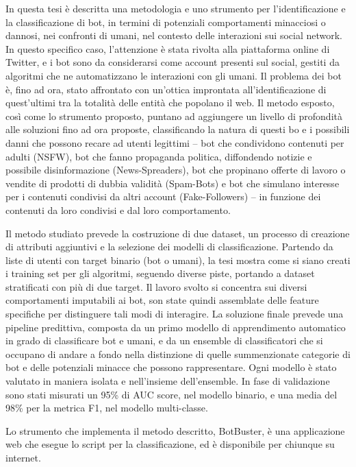 
In questa tesi è descritta una metodologia e uno strumento per l'identificazione e la classificazione di bot, in termini di potenziali comportamenti minacciosi o dannosi, nei confronti di umani, nel contesto delle interazioni sui social network.
In questo specifico caso, l'attenzione è stata rivolta alla piattaforma online di Twitter, e i bot sono da considerarsi come account presenti sul social, gestiti da algoritmi che ne automatizzano le interazioni con gli umani.
Il problema dei bot è, fino ad ora, stato affrontato con un'ottica improntata all'identificazione di quest'ultimi tra la totalità delle entità che popolano il web.
Il metodo esposto, così come lo strumento proposto, puntano ad aggiungere un livello di profondità alle soluzioni fino ad ora proposte, classificando la natura di questi bo e i possibili danni che possono recare ad utenti legittimi -- bot che condividono contenuti per adulti (NSFW), bot che fanno propaganda politica, diffondendo notizie e possibile disinformazione (News-Spreaders), bot che propinano offerte di lavoro o vendite di prodotti di dubbia validità (Spam-Bots) e bot che simulano interesse per i contenuti condivisi da altri account (Fake-Followers) -- in funzione dei contenuti da loro condivisi e dal loro comportamento.

Il metodo studiato prevede la costruzione di due dataset, un processo di creazione di attributi aggiuntivi e la selezione dei modelli di classificazione.
Partendo da liste di utenti con target binario (bot o umani), la tesi mostra come si siano creati i training set per gli algoritmi, seguendo diverse piste, portando a dataset stratificati con più di due target.
Il lavoro svolto si concentra sui diversi comportamenti imputabili ai bot, son state quindi assemblate delle feature specifiche per distinguere tali modi di interagire.
La soluzione finale prevede una pipeline predittiva, composta da un primo modello di apprendimento automatico in grado di classificare bot e umani, e da un ensemble di classificatori che si occupano di andare a fondo nella distinzione di quelle summenzionate categorie di bot e delle potenziali minacce che possono rappresentare.
Ogni modello è stato valutato in maniera isolata e nell'insieme dell'ensemble. In fase di validazione sono stati misurati un 95\% di AUC score, nel modello binario, e una media del 98\% per la metrica F1, nel modello multi-classe.

Lo strumento che implementa il metodo descritto, BotBuster, è una applicazione web che esegue lo script per la classificazione, ed è disponibile per chiunque su internet.
